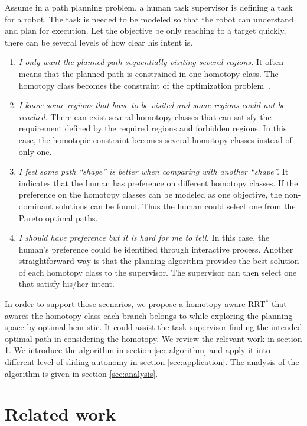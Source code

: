 \documentclass[letterpaper, 10 pt, conference]{ieeeconf}
\begin{document}
Assume in a path planning problem, a human task supervisor is defining a task for a robot.
The task is needed to be modeled so that the robot can understand and plan for execution.
Let the objective be only reaching to a target quickly, there can be several levels of how clear his intent is.
\begin{enumerate}
\item \emph{I only want the planned path sequentially visiting several regions.}
It often means that the planned path is constrained in one homotopy class.
The homotopy class becomes the constraint of the optimization problem~\cite{Hershberger199463}.
\item \emph{I know some regions that have to be visited and some regions could not be reached.}
There can exist several homotopy classes that can satisfy the requirement defined by the required regions and forbidden regions.
In this case, the homotopic constraint becomes several homotopy classes instead of only one.
\item \emph{I feel some path ``shape'' is better when comparing with another ``shape''.}
It indicates that the human has preference on different homotopy classes.
If the preference on the homotopy classes can be modeled as one objective, the non-dominant solutions can be found.
Thus the human could select one from the Pareto optimal paths.
\item \emph{I should have preference but it is hard for me to tell.}
In this case, the human's preference could be identified through interactive process.
Another straightforward way is that the planning algorithm provides the best solution of each homotopy class to the supervisor.
The supervisor can then select one that satisfy his/her intent.
\end{enumerate}

In order to support those scenarios, we propose a homotopy-aware RRT$^{*}$ that awares the homotopy class each branch belongs to while exploring the planning space by optimal heuristic.
It could assist the task supervisor finding the intended optimal path in considering the homotopy.
We review the relevant work in section \ref{sec:related_work}.
We introduce the algorithm in section \ref{sec:algorithm} and apply it into different level of sliding autonomy in section \ref{sec:application}.
The analysis of the algorithm is given in section \ref{sec:analysis}.

\section{Related work}
\label{sec:related_work}
\end{document}
